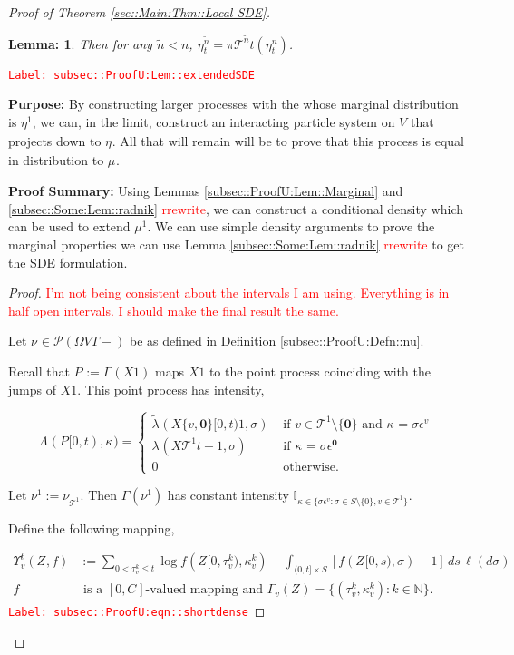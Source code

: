\documentclass[12pt]{article}
\newcommand{\mb}{\mathbb}
\newcommand{\mc}{\mathcal}
\newcommand{\te}{\text}
\newcommand{\ep}{\epsilon}
\newcommand{\tr}{\textcolor{red}}
\newcommand{\labe}[1]{\tr{\texttt{Label: #1}}}
\newcommand{\purpose}{\textbf{Purpose: }}
\newcommand{\pfsum}{\textbf{Proof Summary: }}
\newcommand{\ind}{\hspace{24pt}}
\newcommand{\defeq}{:=}								%
\newcommand{\pmsr}{\mc{P}}							%
\renewcommand{\root}{\mathbf{0}}				%
\renewcommand{\v}{v}							%
\renewcommand{\S}{S}							%
\newcommand{\s}{\sigma}							%
\newcommand{\ev}[1]{\ep^{#1}}					%
\newcommand{\T}{T}								%
\renewcommand{\t}{t}							%
\newcommand{\proj}{\pi}							%
\renewcommand{\tt}{s}							%
\newcommand{\X}{X}								%
\newcommand{\pup}[1]{^{#1}}							%
\newcommand{\tree}{\mc{T}}							%
\newcommand{\rt}[1]{\tau^{#1}}						%
\renewcommand{\it}{k}								%
\newcommand{\numb}{n}								%
\newcommand{\rxvttts}[2]{Z_{#1}{#2}}				%
\newcommand{\rp}[1]{P^{#1}}							%
\newcommand{\m}[3]{\mu_{#2#1}^{#3}}						%
\newcommand{\mm}[3]{\nu_{#2#1}^{#3}}						%
\newcommand{\mmm}[3]{\eta_{#2#1}^{#3}}						%
\newcommand{\rate}[1]{\lambda_{#1}}					%
\newcommand{\ratee}[1]{\Lambda_{#1}}				%
\newcommand{\crate}[2]{\alt{\lambda}_{#1}^{#2}}		%
\newcommand{\const}[1]{C_{#1}}						%
\newcommand{\Sm}{\ell}								%
\newcommand{\alt}{\widetilde}						%
\renewcommand{\mark}[1]{\kappa^{#1}}				%
\newcommand{\ds}[2]{\Upsilon_{#1}^{#2}}			%
\newcommand{\pmap}[1]{\Gamma_{#1}}				%
\newtheorem{lem}[thms]{Lemma: }
\begin{document}
\begin{proof}[Proof of Theorem \ref{sec::Main:Thm::Local SDE}]
\begin{lem}
Then for any \(\alt{\numb} < \numb\), \(\mmm{}{\t}{\alt{\numb}} = \proj{\tree\pup{\alt{\numb}}}{\t}(\mmm{}{\t}{\numb})\).
\label{subsec::ProofU:Lem::extendedSDE}
\end{lem}
\labe{subsec::ProofU:Lem::extendedSDE}

\purpose By constructing larger processes with the whose marginal distribution is \(\mmm{}{}{1}\), we can, in the limit, construct an interacting particle system on \(V\) that projects down to \(\mmm{}{}{}\). All that will remain will be to prove that this process is equal in distribution to \(\m{}{}{}\).

\pfsum Using Lemmas \ref{subsec::ProofU:Lem::Marginal} and \ref{subsec::Some:Lem::radnik} \tr{rrewrite}, we can construct a conditional density which can be used to extend \(\mu\pup{1}\). We can use simple density arguments to prove the marginal properties we can use Lemma \ref{subsec::Some:Lem::radnik} \tr{rrewrite} to get the SDE formulation.

\begin{proof}
\tr{I'm not being consistent about the intervals I am using. Everything is in half open intervals. I should make the final result the same.}

Let \(\mm{}{}{} \in \pmsr(\Omega{ V}{\T-})\) be as defined in Definition \ref{subsec::ProofU:Defn::nu}.

\ind Recall that \(\rp{} \defeq \pmap{}(\X{}{}{1})\) maps \(\X{}{}{1}\) to the point process coinciding with the jumps of \(\X{}{}{1}\). This point process has intensity,

\[\ratee{}(\rp{}[0,\t),\mark{}) = \begin{cases}
\crate{}{}(\X{\{\v,\root\}}{[0,\t)}{1},\s) &\te{ if } \v\in \tree\pup{1}\setminus\{\root\}\te{ and } \mark{} = \s\ev{\v}\\
\rate{}(\X{\tree\pup{1}}{\t-}{1},\s) &\te{ if } \mark{} = \s\ev{\root}\\
0 &\te{ otherwise}.
\end{cases}\]

Let \(\mm{}{}{1} \defeq \mm{\tree\pup{1}}{}{}\). Then \(\pmap{}(\mm{}{}{1})\) has constant intensity \(\mb{I}_{\kappa \in\{\s\ev{\v}:\s\in\S\setminus\{0\},\v\in\tree\pup{1}\}}\). 

\ind Define the following mapping,

\begin{align}
\ds{\v}{\t}(\rxvttts{}{},f) &\defeq \sum_{0 < \rt{\it}_\v \leq \t} \log{f(\rxvttts{}{[0,\rt{\it}_\v)},\mark{\it}_\v)} - \int_{(0,\t]\times \S} [f(\rxvttts{}{[0,\tt)},\s) - 1]\,ds\,\Sm(d\s) \label{subsec::ProofU:eqn::shortdense}\\
f&\te{ is a }[0,\const{}] \te{-valued mapping and } \pmap{\v}(\rxvttts{}{}) = \{(\rt{\it}_\v,\mark{\it}_\v):\it\in\mb{N}\}.\nonumber
\end{align} 
\labe{subsec::ProofU:eqn::shortdense}


\end{proof}
\end{proof}
\end{document}
